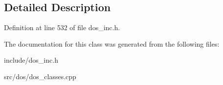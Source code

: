 \subsection{Detailed Description}


Definition at line 532 of file dos\-\_\-inc.\-h.



The documentation for this class was generated from the following files\-:\begin{DoxyCompactItemize}
\item 
include/dos\-\_\-inc.\-h\item 
src/dos/dos\-\_\-classes.\-cpp\end{DoxyCompactItemize}
